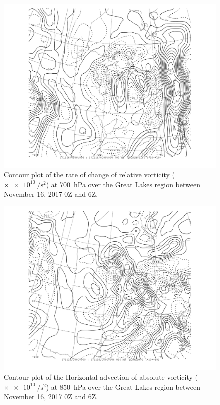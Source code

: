 \documentclass[11pt]{article}
\begin{document}

\begin{figure}[h!]
	\centering
	\includegraphics[width=\textwidth,trim={2.5cm 1cm 2.5cm 0},clip]{dvordt_700hPa_MI}
	\caption{Contour plot of the rate of change of relative vorticity ($\times \SI{e10}{\per\s\squared}$) at \SI{700}{\hecto\Pa} over the Great Lakes region between November 16, 2017 0Z and 6Z.}
	\label{fig:dvordt_700hPa_MI}
\end{figure}

\begin{figure}[h!]
  \centering
  \includegraphics[width=\textwidth,trim={2.5cm 1cm 2.5cm 0},clip]{hor_adv_vor_MI_850hPa}
  \caption{Contour plot of the Horizontal advection of absolute vorticity ($\times \SI{e10}{\per\s\squared}$) at \SI{850}{\hecto\Pa} over the Great Lakes region between November 16, 2017 0Z and 6Z.}
  \label{fig:hor_adv_vor_MI_850hPa}
\end{figure}
\end{document}
